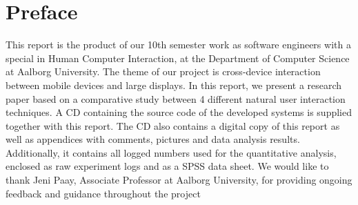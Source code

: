 \section*{Preface}\label{sec:preface}

This report is the product of our 10th semester work as software engineers with a special in Human Computer Interaction, at the Department of Computer Science at Aalborg University.
The theme of our project is cross-device interaction between mobile devices and large displays.
In this report, we present a research paper based on a comparative study between 4 different natural user interaction techniques. 
A CD containing the source code of the developed systems is supplied together with this report.
The CD also contains a digital copy of this report as well as appendices with comments, pictures and data analysis results.
Additionally, it contains all logged numbers used for the quantitative analysis, enclosed as raw experiment logs and as a SPSS data sheet.
We would like to thank Jeni Paay, Associate Professor at Aalborg University, for providing ongoing feedback and guidance throughout the project